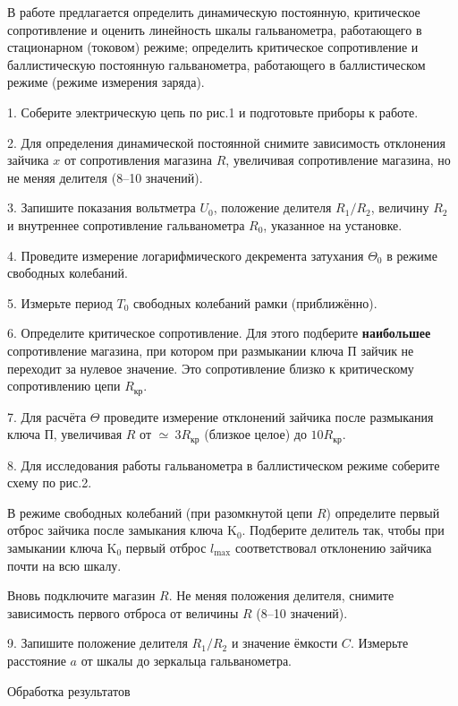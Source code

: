В работе предлагается определить динамическую постоянную, критическое сопротивление и оценить линейность шкалы гальванометра, работающего в стационарном (токовом) режиме; определить критическое сопротивление и баллистическую постоянную гальванометра, работающего в баллистическом режиме (режиме измерения заряда).

1. Соберите электрическую цепь по рис.1 и подготовьте приборы к работе. 

2. Для определения динамической постоянной снимите зависимость отклонения зайчика $x$ от сопротивления магазина $R$, увеличивая сопротивление магазина, но не меняя делителя (8–10 значений).

3. Запишите показания вольтметра $U_0$, положение делителя $R_1/R_2$, величину $R_2$ и внутреннее сопротивление гальванометра $R_0$, указанное на установке.

4. Проведите измерение логарифмического декремента затухания $\Theta_0$ в режиме свободных колебаний.

5. Измерьте период $T_0$ свободных колебаний рамки (приближённо).

6. Определите критическое сопротивление. Для этого подберите \textbf{наибольшее} сопротивление магазина, при котором при размыкании ключа П зайчик не переходит за нулевое значение. Это сопротивление близко к критическому сопротивлению цепи $R_{\text{кр}}$.

7. Для расчёта $\Theta$ проведите измерение отклонений зайчика после размыкания ключа П, увеличивая $R$ от $\simeq~3R_{\text{кр}}$ (близкое целое) до $10 R_{\text{кр}}$.

8. Для исследования работы гальванометра в баллистическом режиме соберите схему по рис.2.

В режиме свободных колебаний (при разомкнутой цепи $R$) определите первый отброс зайчика после замыкания ключа $\text{K}_0$. Подберите делитель так, чтобы при замыкании ключа $\text{K}_0$ первый отброс $l_{\text{max}}$ соответствовал отклонению зайчика почти на всю шкалу.

Вновь подключите магазин $R$. Не меняя положения делителя, снимите зависимость первого отброса от величины $R$ (8–10 значений).

9. Запишите положение делителя $R_1 / R_2$ и значение ёмкости $C$. Измерьте расстояние $a$ от шкалы до зеркальца гальванометра.

\begin{center}
  Обработка результатов
\end{center}

